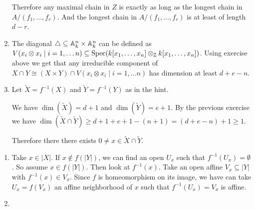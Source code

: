 \begin{exercise}{1}
\begin{enumerate}
{                Therefore any maximal chain in $Z$ is exactly as long as the
                longest chain in $A / (f_1, \dots, f_r)$. And the longest chain
                in $A / (f_1, \dots, f_r)$ is at least of length $d - r$.
            }
        \item{
                The diagonal $\triangle \subseteq \mathbb{A}^n_k \times \mathbb{A}^n_k$ can
                be defined as $V(x_i \otimes x_i \mid i = 1, \dots n) \subseteq
                \operatorname{Spec}(k[x_1, \dots, x_n] \otimes_{\mathbb{Z}} k[x_1, \dots, x_n])$.
                Using exercise above we get that any irreducible component of
                $X \cap Y \cong (X \times Y) \cap V(x_i \otimes x_i \mid i = 1,
                \dots n)$ has dimension at least $d + e - n$.
            }
        \item{
                Let $\tilde{X} = f^{-1}(X)$ and $\tilde{Y} = f^{-1}(Y)$ as in
                the hint.

                We have $\dim(\tilde{X}) = d + 1$ and $\dim(\tilde{Y}) = e + 1$.
                By the previous exercise we have $\dim(\tilde{X} \cap \tilde{Y})
                \geq d + 1 + e + 1 - (n + 1) = (d + e - n) + 1 \geq 1$.

                Therefore there there exists $0 \not= x \in \tilde{X} \cap
                \tilde{Y}$.
            }
    \end{enumerate}
\end{exercise}

\begin{exercise}{2}
    \begin{enumerate}
        \item{
                Take $x \in |X|$. If $x \notin f(|Y|)$, we can find an open
                $U_x$ such that $f^{-1} (U_x) = \emptyset$. So assume $x \in
                f(|Y|)$. Then look at $f^{-1}(x)$. Take an open affine $V_x
                \subseteq |Y|$ with $f^{-1} (x) \in V_x$. Since $f$ is
                homeomorphism on its image, we have can take $U_x = f(V_x)$ an
                affine neighborhood of $x$ such that $f^{-1}(U_x) = V_x$ is
                affine.
            }
        \item{
            }
    \end{enumerate}
\end{exercise}


